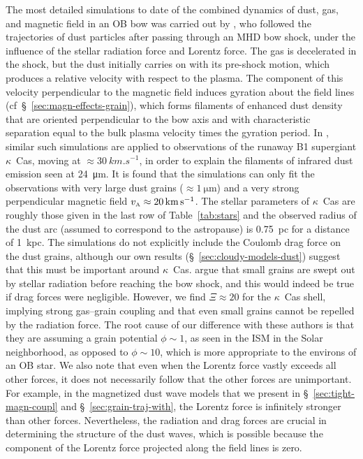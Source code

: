 The most detailed simulations to date of the combined dynamics of
dust, gas, and magnetic field in an OB bow was carried out by
\citet{Katushkina:2017a}, who followed the trajectories of dust
particles after passing through an MHD bow shock, under the influence
of the stellar radiation force and Lorentz force.  The gas is
decelerated in the shock, but the dust initially carries on with its
pre-shock motion, which produces a relative velocity with respect to
the plasma. The component of this velocity perpendicular to the
magnetic field induces gyration about the field lines
(cf~\S~\ref{sec:magn-effects-grain}), which forms filaments of
enhanced dust density that are oriented perpendicular to the bow axis
and with characteristic separation equal to the bulk plasma velocity
times the gyration period.  In \citet{Katushkina:2018a}, similar such
simulations are applied to observations of the runaway B1 supergiant
\(\kappa\)~Cas, moving at \(\approx \SI{30}{km.s^{-1}}\), in order to explain the
filaments of infrared dust emission seen at \SI{24}{\um}.  It is found
that the simulations can only fit the observations with very large
dust grains (\(\approx \SI{1}{\um}\)) and a very strong perpendicular
magnetic field \(v_{\scriptscriptstyle\text{A}} \approx \SI{20}{km.s^{-1}}\).  The stellar
parameters of \(\kappa\)~Cas are roughly those given in the last row of
Table~\ref{tab:stars} and the observed radius of the dust arc (assumed
to correspond to the astropause) is \SI{0.75}{pc} for a distance of
\SI{1}{kpc}.  The \citeauthor{Katushkina:2018a} simulations do not
explicitly include the Coulomb drag force on the dust grains, although
our own results (\S~\ref{sec:cloudy-models-dust}) suggest that this
must be important around \(\kappa\)~Cas.  \citet{Katushkina:2018a} argue
that small grains are swept out by stellar radiation before reaching
the bow shock, and this would indeed be true if drag forces were
negligible.  However, we find \(\Xi \approx 20\) for the
\(\kappa\)~Cas shell, implying strong gas--grain coupling and that even
small grains cannot be repelled by the radiation force.  The root
cause of our difference with these authors is that they are assuming a
grain potential \(\phi \sim 1\), as seen in the ISM in the Solar
neighborhood, as opposed to \(\phi \sim 10\), which is more appropriate to
the environs of an OB star.  We also note that even when the Lorentz
force vastly exceeds all other forces, it does not necessarily follow
that the other forces are unimportant.  For example, in the
magnetized dust wave models that we present in
\S~\ref{sec:tight-magn-coupl} and \S~\ref{sec:grain-traj-with}, the
Lorentz force is infinitely stronger than other forces.  Nevertheless,
the radiation and drag forces are crucial in determining the structure
of the dust waves, which is possible because the component of the
Lorentz force projected along the field lines is zero.

